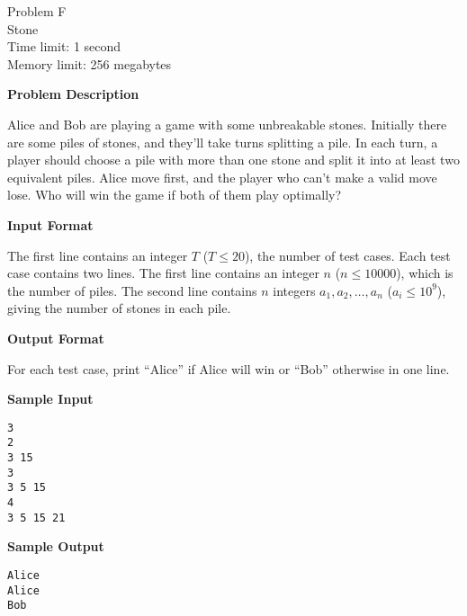 \documentclass[11pt]{article}
\begin{document}
\begin{center}
    {\LARGE Problem F}\\
    {\Large Stone}\\
    {Time limit: 1 second}\\
    {Memory limit: 256 megabytes}
\end{center}

\textbf{\large Problem Description}

Alice and Bob are playing a game with some unbreakable stones. Initially there
are some piles of stones, and they'll take turns splitting a pile. In each turn,
a player should choose a pile with more than one stone and split it into at
least two equivalent piles. Alice move first, and the player who can't make a
valid move lose. Who will win the game if both of them play optimally?

\textbf{\large Input Format}

The first line contains an integer $T$ ($T\le 20$), the number of test cases.
Each test case contains two lines.
The first line contains an integer $n$ ($n\le 10000$), which is the number of
piles.
The second line contains $n$ integers $a_1,a_2,\dots,a_n$ ($a_i\le 10^9$),
giving the number of stones in each pile.

\textbf{\large Output Format}

For each test case, print ``Alice'' if Alice will win or ``Bob'' otherwise in
one line.

\textbf{\large Sample Input}

\begin{verbatim}
3
2
3 15
3
3 5 15
4 
3 5 15 21
\end{verbatim}

\textbf{\large Sample Output}
\begin{verbatim}
Alice
Alice
Bob
\end{verbatim}
\end{document}

